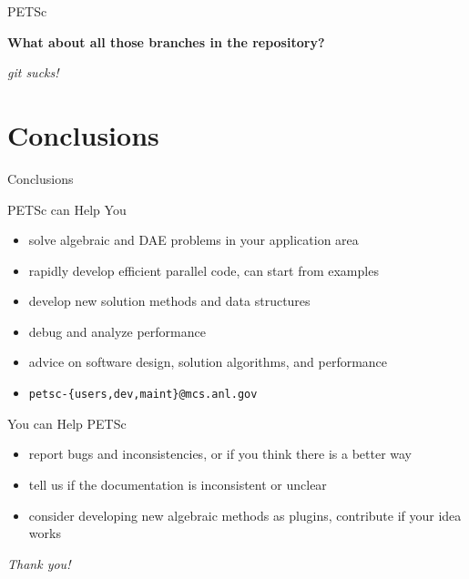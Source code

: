 \begin{frame}{PETSc}
   \begin{center} \Large \textbf{What about all those branches in the repository?} \end{center}
  \begin{flushright} \vspace*{4cm}
   \textit{git sucks!}
  \end{flushright}
\end{frame}





%
%
\section{Conclusions}
\begin{frame}{Conclusions}
 
 \begin{block}{PETSc can Help You}
  \begin{itemize}
   \item solve algebraic and DAE problems in your application area
   \item rapidly develop efficient parallel code, can start from examples
   \item develop new solution methods and data structures
   \item debug and analyze performance
   \item advice on software design, solution algorithms, and performance
   \item \centering \texttt{petsc-\{users,dev,maint\}@mcs.anl.gov}

  \end{itemize}
 \end{block}

 \begin{block}{You can Help PETSc}
  \begin{itemize}
   \item report bugs and inconsistencies, or if you think there is a better way
   \item tell us if the documentation is inconsistent or unclear
   \item consider developing new algebraic methods as plugins, contribute if your idea works
  \end{itemize}
 \end{block}

   \begin{flushright}
   \textit{Thank you!}
  \end{flushright}

\end{frame}

